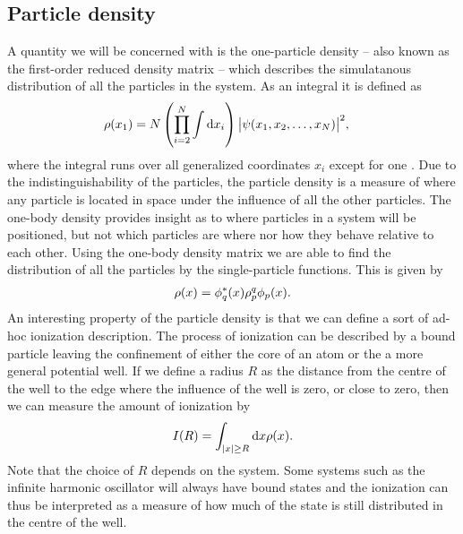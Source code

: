        \subsection{Particle density}
            A quantity we will be concerned with is the one-particle density --
            also known as the first-order reduced density matrix -- which
            describes the simulatanous distribution of all the particles in the
            system.
            As an integral it is defined as
            \begin{align}
                \rho(x_1)
                &= N\left( \prod_{i = 2}^{N} \int \dd x_i \right)
                \abs{\psi(x_1, x_2, \dots, x_N)}^2,
            \end{align}
            where the integral runs over all generalized coordinates $x_i$
            except for one \cite{lowdin-density-matrices, hogberget2013quantum}.
            Due to the indistinguishability of the particles, the particle
            density is a measure of where any particle is located in space under
            the influence of all the other particles.
            The one-body density provides insight as to where particles in a
            system will be positioned, but not which particles are where nor how
            they behave relative to each other.
            Using the one-body density matrix we are able to find the
            distribution of all the particles by the single-particle functions.
            This is given by
            \begin{align}
                \rho(x)
                =
                \phi^{*}_q(x) \rho^{q}_{p} \phi_p(x).
            \end{align}
            An interesting property of the particle density is that we can
            define a sort of ad-hoc ionization description.
            The process of ionization can be described by a bound particle
            leaving the confinement of either the core of an atom or the a more
            general potential well.
            If we define a radius $R$ as the distance from the centre of the
            well to the edge where the influence of the well is zero, or close
            to zero, then we can measure the amount of ionization by
            \begin{align}
                I(R) = \int_{\abs{x} \geq R}\dd x\rho(x).
            \end{align}
            Note that the choice of $R$ depends on the system.
            Some systems such as the infinite harmonic oscillator will always
            have bound states and the ionization can thus be interpreted as a
            measure of how much of the state is still distributed in the centre
            of the well.

